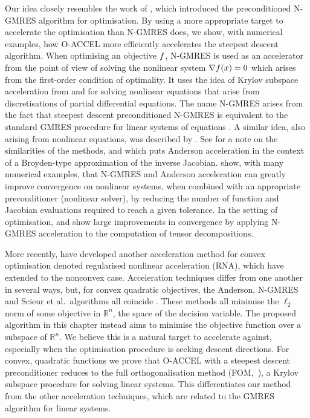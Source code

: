 \documentclass[main.tex]{subfiles}
\begin{document}
Our idea closely resembles the work of \citet{sterck2013steepest},
which introduced the preconditioned N-GMRES
algorithm for optimisation. By using a more appropriate target to
accelerate the optimisation than N-GMRES does, we show, with numerical
examples, how O-ACCEL more efficiently accelerates the steepest
descent algorithm.  When optimising an objective $f$, N-GMRES is
used as an accelerator from the point of view of solving the nonlinear
system $\nabla f(x)=0$ which arises from the first-order condition
of optimality.  It uses the idea of Krylov subspace acceleration from
\citet{washio1997krylov} and \citet{oosterlee2000krylov} for solving
nonlinear equations that arise from discretisations of partial
differential equations.  The name N-GMRES arises from the fact that
steepest descent preconditioned N-GMRES is equivalent to the standard
GMRES procedure for linear systems of equations
\citep{washio1997krylov,sterck2013steepest}.  A similar idea, also
arising from nonlinear equations, was described by
\citet{anderson1965iterative}. See
\citet{walker2011anderson} for a note on the similarities of the
methods, and \citet{fang2009two} which puts Anderson acceleration in
the context of a Broyden-type approximation of the inverse Jacobian.
\citet{brune2015composing} show, with many numerical examples, that
N-GMRES and Anderson acceleration can greatly improve convergence on
nonlinear systems, when combined with an appropriate preconditioner
(nonlinear solver), by reducing the number of function and Jacobian
evaluations required to reach a given tolerance.
In the setting of optimisation,
\citet{sterck2012nonlinear} and \citet{sterck2016nonlinearly} show
large improvements in convergence by applying N-GMRES acceleration to
the computation of tensor decompositions.

More recently, \citet{damien2016regularized} have developed another
acceleration method for convex optimisation denoted regularised
nonlinear acceleration (RNA), which \citet{cartis2017accelerating}
have extended to the nonconvex case.  Acceleration techniques differ
from one another in several ways, but, for convex quadratic
objectives, the Anderson, N-GMRES and Scieur et al.\ algorithms all
coincide \citep{cartis2017accelerating}.  These methods all minimise
the $\ell_2$ norm of some objective in $\mathbb{R}^n$, the space of
the decision variable.  The proposed algorithm in this chapter
instead aims to minimise the objective function over a subspace of
$\mathbb{R}^n$.  We believe this is a natural target to accelerate
against, especially when the optimisation procedure is seeking descent
directions.  For convex, quadratic functions we prove that O-ACCEL
with a steepest descent preconditioner reduces to the full
orthogonalisation method (FOM,~\citet{saad2003iterative}), a Krylov
subspace procedure for solving linear systems. This differentiates our
method from the other acceleration techniques, which are related to
the GMRES algorithm for linear systems.
\end{document}
